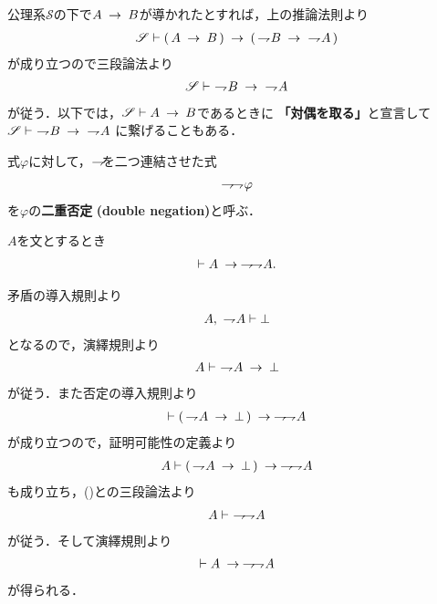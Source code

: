 	公理系$\mathscr{S}$の下で$A \rarrow B$が導かれたとすれば，上の推論法則より
	\begin{align}
		\mathscr{S} \vdash (\, A \rarrow B\, ) 
		\rarrow (\, \negation B \rarrow\ \negation A\, )
	\end{align}
	が成り立つので三段論法より
	\begin{align}
		\mathscr{S} \vdash\ \negation B \rarrow\ \negation A
	\end{align}
	が従う．以下では，$\mathscr{S} \vdash A \rarrow B$であるときに
	{\bf 「対偶を取る」}と宣言して$\mathscr{S} \vdash\ \negation B \rarrow\ \negation A$
	に繋げることもある．
	
	\begin{screen}
		\begin{dfn}[二重否定]
			式$\varphi$に対して，$\negation$を二つ連結させた式
			\begin{align}
				\negation \negation \varphi
			\end{align}
			を$\varphi$の{\bf 二重否定}
			{\bf (double negation)}と呼ぶ．
		\end{dfn}
	\end{screen}
		
	\begin{screen}
		\begin{logicalthm}[二重否定の導入]
		\label{logicalthm:introduction_of_double_negation}
			$A$を文とするとき
			\begin{align}
				\vdash A \rarrow \negation \negation A.
			\end{align}
		\end{logicalthm}
	\end{screen}
	
	\begin{prf}
		矛盾の導入規則より
		\begin{align}
			A,\ \negation A \vdash \bot
		\end{align}
		となるので，演繹規則より
		\begin{align}
			A \vdash\ \negation A \rarrow \bot
			\label{fom:introduction_of_double_negation}
		\end{align}
		が従う．また否定の導入規則より
		\begin{align}
			\vdash (\, \negation A \rarrow \bot\, ) \rarrow \negation \negation A
		\end{align}
		が成り立つので，証明可能性の定義より
		\begin{align}
			A \vdash (\, \negation A \rarrow \bot\, ) \rarrow \negation \negation A
		\end{align}
		も成り立ち，()との三段論法より
		\begin{align}
			A \vdash\ \negation \negation A
		\end{align}
		が従う．そして演繹規則より
		\begin{align}
			\vdash A \rarrow \negation \negation A
		\end{align}
		が得られる．
		\QED
	\end{prf}
	

